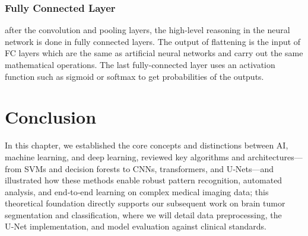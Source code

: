 \subsubsection{Fully Connected Layer}

after the convolution and pooling layers, the high-level reasoning in the neural network is done in fully connected layers. The output of flattening is the input of FC layers which are the same as artificial neural networks and carry out the same mathematical operations. The last fully-connected layer uses an activation function such as sigmoid or softmax to get probabilities of the outputs.



\section{Conclusion}
\label{sec:conclusion}

In this chapter, we established the core concepts and distinctions between AI, machine learning, and deep learning, reviewed key algorithms and architectures—from SVMs and decision forests to CNNs, transformers, and U‑Nets—and illustrated how these methods enable robust pattern recognition, automated analysis, and end‑to‑end learning on complex medical imaging data; this theoretical foundation directly supports our subsequent work on brain tumor segmentation and classification, where we will detail data preprocessing, the U‑Net implementation, and model evaluation against clinical standards.
